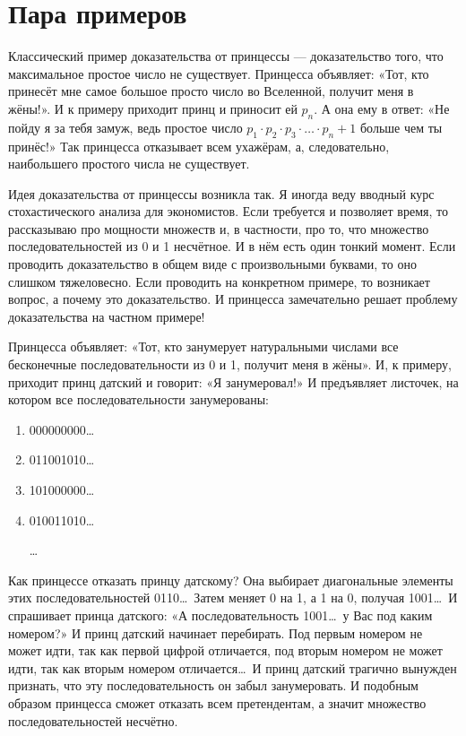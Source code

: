 \documentclass[10pt]{article}
\begin{document}
\section{Пара примеров}

Классический пример доказательства от принцессы --- доказательство того, что максимальное простое число не существует. Принцесса объявляет: «Тот, кто принесёт мне самое большое просто число во Вселенной, получит меня в жёны!». И к примеру приходит принц и приносит ей $p_n$. А она ему в ответ: «Не пойду я за тебя замуж, ведь простое число
$p_1 \cdot p_2 \cdot p_3 \cdot \ldots \cdot p_n + 1$
больше чем ты принёс!» Так принцесса отказывает всем ухажёрам, а, следовательно, наибольшего простого числа не существует.

Идея доказательства от принцессы возникла так. Я иногда веду вводный курс стохастического анализа для экономистов. Если требуется и позволяет время, то рассказываю про мощности множеств и, в частности, про то, что множество последовательностей из 0 и 1 несчётное. И в нём есть один тонкий момент. Если проводить доказательство в общем виде с произвольными буквами, то оно слишком тяжеловесно. Если проводить на конкретном примере, то возникает вопрос, а почему это доказательство. И принцесса замечательно решает  проблему доказательства на частном примере!

Принцесса объявляет: «Тот, кто занумерует натуральными числами все бесконечные последовательности из 0 и 1, получит меня в жёны». И, к примеру, приходит принц датский и говорит: «Я занумеровал!» И предъявляет листочек, на котором все последовательности занумерованы:

\begin{enumerate}
\item 000000000\ldots
\item 011001010\ldots
\item 101000000\ldots
\item 010011010\ldots

\ldots
\end{enumerate}

Как принцессе отказать принцу датскому? Она выбирает диагональные элементы этих последовательностей 0110\ldots\, Затем меняет 0 на 1, а 1 на 0, получая 1001\ldots\, И спрашивает принца датского: «А последовательность 1001\ldots\, у Вас под каким номером?» И принц датский начинает перебирать. Под первым номером не может идти, так как первой цифрой отличается, под вторым номером не может идти, так как вторым номером отличается\ldots\, И принц датский трагично вынужден признать, что эту последовательность он забыл занумеровать. И подобным образом принцесса сможет отказать всем претендентам, а значит множество последовательностей несчётно.
\end{document}
